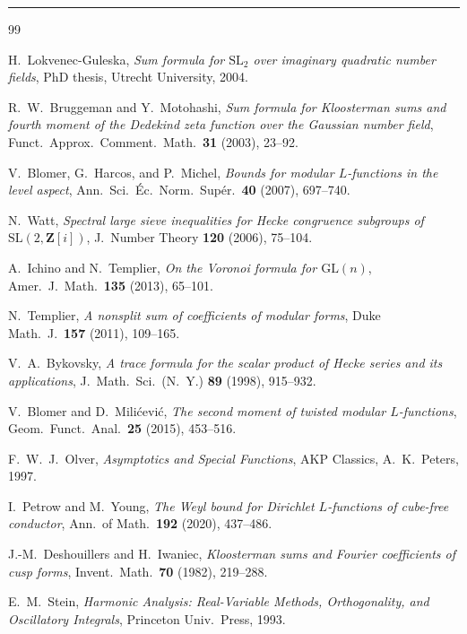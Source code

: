 \documentclass[11pt]{article}
\theoremstyle{definition}
\newcommand{\Z}{\mathbf{Z}}
\begin{document}
\bigskip\hrule\bigskip

\begin{thebibliography}{99}

 H.~Lokvenec-Guleska, \emph{Sum formula for $\mathrm{SL}_2$ over imaginary quadratic number fields}, PhD thesis, Utrecht University, 2004.

 R.~W.~Bruggeman and Y.~Motohashi, \emph{Sum formula for Kloosterman sums and fourth moment of the Dedekind zeta function over the Gaussian number field}, Funct.\ Approx.\ Comment.\ Math.\ \textbf{31} (2003), 23--92.

 V.~Blomer, G.~Harcos, and P.~Michel, \emph{Bounds for modular $L$-functions in the level aspect}, Ann.\ Sci.\ \'Ec.\ Norm.\ Sup\'er.\ \textbf{40} (2007), 697--740.

 N.~Watt, \emph{Spectral large sieve inequalities for Hecke congruence subgroups of $\mathrm{SL}(2,\Z[i])$}, J.\ Number Theory \textbf{120} (2006), 75--104.

 A.~Ichino and N.~Templier, \emph{On the Voronoi formula for $\mathrm{GL}(n)$}, Amer.\ J.\ Math.\ \textbf{135} (2013), 65--101.

 N.~Templier, \emph{A nonsplit sum of coefficients of modular forms}, Duke Math.\ J.\ \textbf{157} (2011), 109--165.

 V.~A.~Bykovsky, \emph{A trace formula for the scalar product of Hecke series and its applications}, J.\ Math.\ Sci.\ (N.\ Y.) \textbf{89} (1998), 915--932.

 V.~Blomer and D.~Mili\'cevi\'c, \emph{The second moment of twisted modular $L$-functions}, Geom.\ Funct.\ Anal.\ \textbf{25} (2015), 453--516.

 F.~W.~J.~Olver, \emph{Asymptotics and Special Functions}, AKP Classics, A.~K.~Peters, 1997.

 I.~Petrow and M.~Young, \emph{The Weyl bound for Dirichlet $L$-functions of cube-free conductor}, Ann.\ of Math.\ \textbf{192} (2020), 437--486.

 J.-M.~Deshouillers and H.~Iwaniec, \emph{Kloosterman sums and Fourier coefficients of cusp forms}, Invent.\ Math.\ \textbf{70} (1982), 219--288.

 E.~M.~Stein, \emph{Harmonic Analysis: Real-Variable Methods, Orthogonality, and Oscillatory Integrals}, Princeton Univ.\ Press, 1993.

\end{thebibliography}
\end{document}
